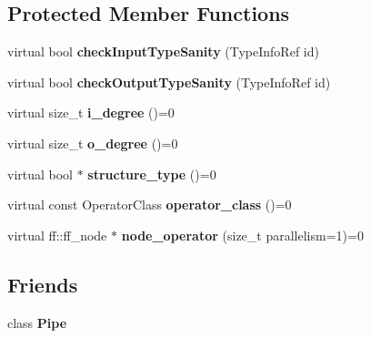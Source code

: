 \subsection*{\-Protected \-Member \-Functions}
\begin{DoxyCompactItemize}
\item 
\hypertarget{class_binary_operator_a2de8a96fc037a231f39b3118069f5b08}{virtual bool {\bfseries check\-Input\-Type\-Sanity} (\-Type\-Info\-Ref id)}\label{class_binary_operator_a2de8a96fc037a231f39b3118069f5b08}

\item 
\hypertarget{class_binary_operator_a90a60672775f8d7958dda0600c5ed546}{virtual bool {\bfseries check\-Output\-Type\-Sanity} (\-Type\-Info\-Ref id)}\label{class_binary_operator_a90a60672775f8d7958dda0600c5ed546}

\item 
\hypertarget{class_binary_operator_a97a69de42fae8bab00c814459ea844b0}{virtual size\-\_\-t {\bfseries i\-\_\-degree} ()=0}\label{class_binary_operator_a97a69de42fae8bab00c814459ea844b0}

\item 
\hypertarget{class_binary_operator_aee9650145b55dfcd040042d9be249171}{virtual size\-\_\-t {\bfseries o\-\_\-degree} ()=0}\label{class_binary_operator_aee9650145b55dfcd040042d9be249171}

\item 
\hypertarget{class_binary_operator_a2fc538f30e110d6313bad1066236143b}{virtual bool $\ast$ {\bfseries structure\-\_\-type} ()=0}\label{class_binary_operator_a2fc538f30e110d6313bad1066236143b}

\item 
\hypertarget{class_binary_operator_a8c247face4b17579873d45b4b14df527}{virtual const \-Operator\-Class {\bfseries operator\-\_\-class} ()=0}\label{class_binary_operator_a8c247face4b17579873d45b4b14df527}

\item 
\hypertarget{class_binary_operator_aeedefcb624a8ab84b10bbab872df72e4}{virtual ff\-::ff\-\_\-node $\ast$ {\bfseries node\-\_\-operator} (size\-\_\-t parallelism=1)=0}\label{class_binary_operator_aeedefcb624a8ab84b10bbab872df72e4}

\end{DoxyCompactItemize}
\subsection*{\-Friends}
\begin{DoxyCompactItemize}
\item 
\hypertarget{class_binary_operator_adb788d0aa2d64624d3602a985936d7da}{class {\bfseries \-Pipe}}\label{class_binary_operator_adb788d0aa2d64624d3602a985936d7da}

\end{DoxyCompactItemize}


